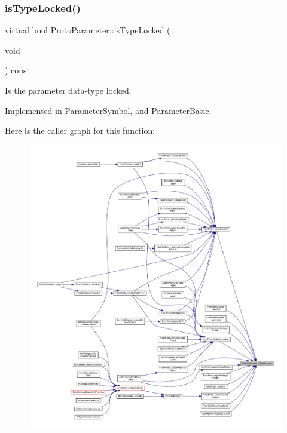 \subsubsection{\texorpdfstring{isTypeLocked()}{isTypeLocked()}}
{\footnotesize\ttfamily virtual bool Proto\+Parameter\+::is\+Type\+Locked (\begin{DoxyParamCaption}\item[{void}]{ }\end{DoxyParamCaption}) const\hspace{0.3cm}{\ttfamily [pure virtual]}}



Is the parameter data-\/type locked. 



Implemented in \mbox{\hyperlink{class_parameter_symbol_a91e7013d6ae6692ca8bdd95834625a2d}{Parameter\+Symbol}}, and \mbox{\hyperlink{class_parameter_basic_a837bdcd23e9bdfad0b8ba0b6b78b9752}{Parameter\+Basic}}.

Here is the caller graph for this function\+:
\nopagebreak
\begin{figure}[H]
\begin{center}
\leavevmode
\includegraphics[width=350pt]{class_proto_parameter_a155b564b34ae0b36d39d5a1caf5d0014_icgraph}
\end{center}
\end{figure}
\mbox{\label{class_proto_parameter_a82ceb5d7de4394d1e0760bc38a78fe0c}} 
